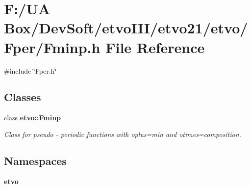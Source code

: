 \section{F\+:/\+UA Box/\+Dev\+Soft/etvo\+I\+I\+I/etvo21/etvo/\+Fper/\+Fminp.h File Reference}
\label{_fminp_8h}
{\ttfamily \#include \char`\"{}Fper.\+h\char`\"{}}\newline
\subsection*{Classes}
\begin{DoxyCompactItemize}
\item 
class \textbf{ etvo\+::\+Fminp}
\begin{DoxyCompactList}\small\item\em Class for pseudo -\/ periodic functions with oplus=min and otimes=composition. \end{DoxyCompactList}\end{DoxyCompactItemize}
\subsection*{Namespaces}
\begin{DoxyCompactItemize}
\item 
 \textbf{ etvo}
\end{DoxyCompactItemize}
